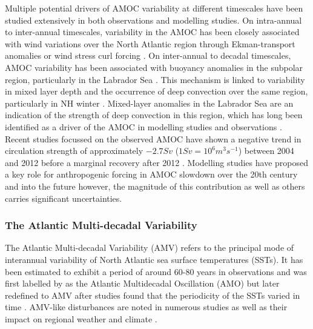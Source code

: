 {Multiple potential drivers of AMOC variability at different timescales have been studied extensively in both observations and modelling studies. On intra-annual to inter-annual timescales, variability in the AMOC has been closely associated with wind variations over the North Atlantic region through Ekman-transport anomalies or wind stress curl forcing \citep{wangCharacteristic2019, mccarthyObserved2012, mielkeObserved2013, yangLocal2015}. On inter-annual to decadal timescales, AMOC variability has been associated with buoyancy anomalies in the subpolar region, particularly in the Labrador Sea \citep{delworthInterdecadal1993, medhaugMechanisms2012}. This mechanism is linked to variability in mixed layer depth and the occurrence of deep convection over the same region, particularly in NH winter \citep{boningDecadal2006a, biastochCauses2008a, robsonCauses2012, wangVariability2015}. Mixed-layer anomalies in the Labrador Sea are an indication of the strength of deep convection in this region, which has long been identified as a driver of the AMOC in modelling studies \citep{edenMechanism2001, edenNorth2001} and observations \citep{latifPerspective2011}. Recent studies focussed on the observed AMOC have shown a negative trend in circulation strength of approximately $-2.7 Sv$ ($1 Sv = 10^6 m^3 s^{-1}$) between 2004 and 2012 \citep{smeedNorth2018} before a marginal recovery after 2012 \citep{smeedAtlantic2019}. Modelling studies have proposed a key role for anthropogenic forcing in AMOC slowdown over the 20th century and into the future \cite{liuOverlooked2017, bakkerFate2016, liuMechanisms2019} however, the magnitude of this contribution as well as others carries significant uncertainties.

\subsubsection*{The Atlantic Multi-decadal Variability}
The Atlantic Multi-decadal Variability (AMV) refers to the principal mode of interannual variability of North Atlantic sea surface temperatures (SSTs). It has been estimated to exhibit a period of around 60-80 years in observations and was first labelled by \cite{Kerr2000} as the Atlantic Multidecadal Oscillation (AMO) but later redefined to AMV after studies found that the periodicity of the SSTs varied in time \citep{Gray2004,Knudsen2011}. AMV-like disturbances are noted in numerous studies \citep{Kushnir,Frankcombe2010,Medhaug2011} as well as their impact on regional weather and climate \citep{Ting2011}.

}
